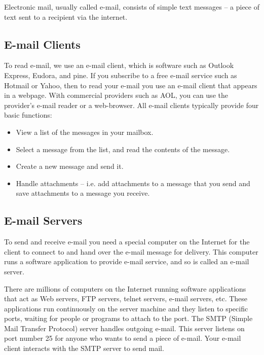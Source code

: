 
Electronic mail, usually called e-mail, consists of simple text messages -- 
a piece of text sent to a recipient via the internet. 

\subsection*{E-mail Clients}

To read e-mail, we use an e-mail client, which is software
such as Outlook Express, Eudora, and pine.
If you subscribe to a free e-mail service such as
Hotmail or Yahoo, then to read your e-mail 
you use an e-mail client that appears in a webpage.
With commercial providers such as AOL, you 
can use the provider's e-mail reader or a web-browser. 
All e-mail clients typically provide four basic 
functions: 

\begin{itemize}
\item View a list of the messages in your mailbox.

\item Select a message from the list, and read the 
contents of the message.

\item Create a new message and send it. 

\item Handle attachments -- i.e. add attachments to a message that you 
send and save attachments to a message you receive. 
\end{itemize}


\subsection*{E-mail Servers}
To send and receive e-mail you need a special 
computer on the Internet for the client to connect
to and hand over the e-mail message for delivery.
This computer runs a software application to
provide e-mail service, and so is called an
e-mail server.

There are millions of computers on the Internet
running software applications that act as 
Web servers, FTP servers, telnet servers, 
e-mail servers, etc. 
These applications run continuously on the server
machine and they listen to specific ports, 
waiting for people or programs to attach to the port. 
The SMTP (Simple Mail Transfer Protocol) server
handles outgoing e-mail.
This server listens on port number 25 for 
anyone who wants to send a piece of e-mail.
Your e-mail client interacts with the SMTP
server to send mail.


